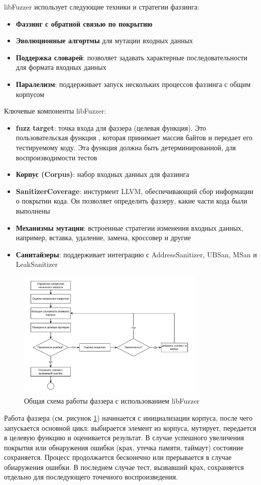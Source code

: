 libFuzzer использует следующие техники и стратегии фаззинга:
\begin{itemize}
	\item \textbf{Фаззинг с обратной связью по покрытию}
	\item \textbf{Эволюционные алгортмы} для мутации входных данных
	\item \textbf{Поддержка словарей}: позволяет задавать характерные последовательности для формата входных данных
	\item \textbf{Паралелизм}: поддерживает запуск нескольких процессов фаззинга с общим корпусом
\end{itemize}

Ключевые компоненты libFuzzer:
\begin{itemize}
	\item \textbf{fuzz target}: точка входа для фаззера (целевая функция). Это пользовательская функция , которая принимает массив байтов и передает его тестируемому коду. Эта функция должна быть детерминированной, для воспроизводимости тестов
	\item \textbf{Корпус (Corpus)}: набор входных данных для фаззинга
	\item \textbf{SanitizerCoverage}: инстурмент LLVM, обеспечивающий сбор информации о покрытии кода. Он позволяет определить фаззеру, какие части кода были выполнены
	\item \textbf{Механизмы мутации}: встроенные стратегии изменения входных данных, например, вставка, удаление, замена, кроссовер и другие
	\item \textbf{Санитайзеры}: поддерживает интеграцию с AddressSanitizer, UBSan, MSan и LeakSanitizer
\end{itemize}
\begin{figure}[htbp]
	\centering %
	\includegraphics[width=0.8\textwidth]{Piclibfuzz.pdf} %
	\caption{Общая схема работы фаззера с использованием libFuzzer} %
	\label{intro:libfuzz} %
\end{figure}
Работа фаззера (см. рисунок \ref{intro:libfuzz}) начинается с инициализации корпуса, после чего запускается основной цикл: выбирается элемент из корпуса, мутирует, передается в целевую функцию и оценивается результат. В случае успешного увеличения покрытия или обнаружения ошибки (крах, утечка памяти, таймаут) состояние сохраняется. Процесс продолжается бесконечно или прерывается в случае обнаружения ошибки. В последнем случае тест, вызвавший крах, сохраняется отдельно для последующего точечного воспроизведения.

